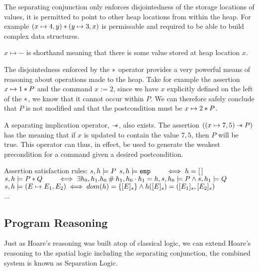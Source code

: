 \documentclass[a4paper]{report}
\begin{document}
  The separating conjunction only enforces disjointedness of the storage
  locations of values, it is permitted to point to other heap locations from
  within the heap. For example $(x \mapsto 4, y) \mathbin{*} (y \mapsto 3, x)$ is
  permissable and required to be able to build complex data structures.


  $x \mapsto -$ is shorthand meaning that there is some value stored at heap
  location $x$.

  The disjointedness enforced by the $\mathbin{*}$ operator provides a very powerful
  means of reasoning about operations made to the heap. Take for example the
  assertion $x \mapsto 1 \mathbin{*} P$ and the command $x := 2$, since we have $x$
  explicitly defined on the left of the $\mathbin{*}$, we know that it cannot occur
  within $P$. We can therefore safely conclude that $P$ is not modified and that
  the postcondition must be $x \mapsto 2 \mathbin{*} P$.

  A separating implication operator, $\mathbin{-\mkern-6mu *}$, also exists. The assertion $((x
  \mapsto 7, 5) \mathbin{-\mkern-6mu *} P)$ has the meaning that if $x$ is updated to contain the
  value $7, 5$, then $P$ will be true. This operator can thus, in effect, be
  used to generate the weakest precondition for a command given a desired
  postcondition.

  \begin{display}{Assertion satisfaction rules: $s,h \models P$}
    $s,h \models \texttt{emp} \qquad \iff h = [\,]$ \\
    $s,h \models P \mathbin{*} Q \qquad \iff \exists h_0, h_1.h_0 \mathbin{\#} h_1, h_0 \cdot
    h_1 = h, s, h_0 \models P \land s,h_1 \models Q$ \\
    $s,h \models (E \mapsto E_1, E_2) \iff dom(h) = \{[E]_s\} \land h([E]_s)
    = ([E_1]_s, [E_2]_s)$ \\
    ...
  \end{display}

  \subsection{Program Reasoning}

  Just as Hoare's reasoning was built atop of classical logic, we can extend
  Hoare's reasoning to the spatial logic including the separating conjunction,
  the combined system is known as Separation Logic.
\end{document}
